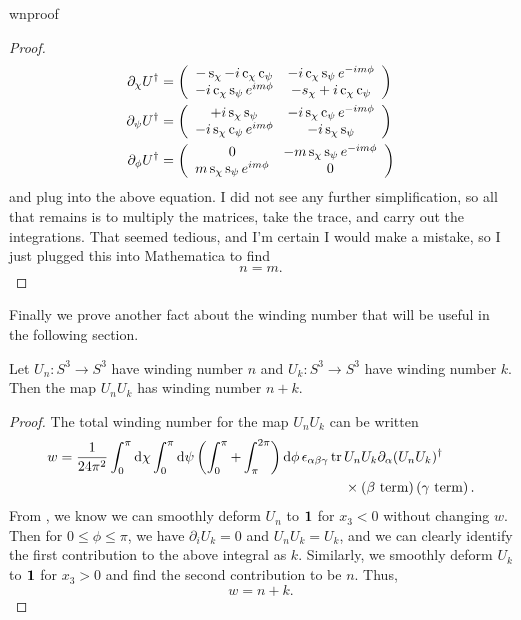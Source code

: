 \begin{proposition}{}{wnproof}
\begin{proof}
\begin{equation*}
\begin{aligned}
    \partial_\chi U^\dagger
             &=\left(\begin{array}{cc}
                  -\operatorname{s}_\chi-i\operatorname{c}_\chi\operatorname{c}_\psi  & -i\operatorname{c}_\chi\operatorname{s}_\psi e^{-im\phi}\\
                 -i\operatorname{c}_\chi\operatorname{s}_\psi e^{im\phi} & -s_\chi+i\operatorname{c}_\chi\operatorname{c}_\psi 
                \end{array}\right)\\
    \partial_\psi U^\dagger
             &=\left(\begin{array}{cc}
                  +i\operatorname{s}_\chi\operatorname{s}_\psi & -i\operatorname{s}_\chi\operatorname{c}_\psi e^{-im\phi}\\
                 -i\operatorname{s}_\chi\operatorname{c}_\psi e^{im\phi} & -i\operatorname{s}_\chi\operatorname{s}_\psi 
                \end{array}\right)\\
  \partial_\phi U^\dagger
             &=\left(\begin{array}{cc}
                  0 & -m\operatorname{s}_\chi\operatorname{s}_\psi e^{-im\phi}\\
                 m\operatorname{s}_\chi\operatorname{s}_\psi e^{im\phi} & 0 
                \end{array}\right)
  \end{aligned}
  \end{equation*}
  and plug into the above equation. I did not see any further simplification,
  so all that remains is to multiply the matrices, take the trace, and
  carry out the integrations. That seemed tedious, and I'm certain I would
  make a mistake, so I just plugged this into Mathematica to find 
  $$n=m.$$
\end{proof}\end{proposition}

Finally we prove another fact about the winding number that will be useful
in the following section.
\begin{proposition}{}{}
  Let $U_n:S^3\to S^3$ have winding number $n$ and
  $U_k:S^3\to S^3$ have winding number $k$. Then the map
  $U_n U_k$ has winding number $n+k$.
  \begin{proof}
    The total winding number for the map $U_n U_k$ can be written
    \begin{equation*}\begin{aligned}
      w=\frac{1}{24\pi^2}\int_0^\pi\dd{\chi}\int_0^\pi\dd{\psi}
          \left(\int_0^\pi+\int_\pi^{2\pi}\right)\dd{\phi}
          \epsilon_{\alpha\beta\gamma}\tr\,
          &U_nU_k\partial_\alpha(U_nU_k)^\dagger\\
          &\times\left(\text{$\beta$ term}\right)
          \left(\text{$\gamma$ term}\right).
    \end{aligned}\end{equation*}
    From , we know we can smoothly
    deform $U_n$ to ${\mathbf 1}$ for $x_3<0$ without changing $w$.
    Then for $0\leq\phi\leq\pi$, we have
    $\partial_i U_k=0$ and $U_n U_k=U_k$, and we can clearly identify
    the first contribution to the above integral as $k$.
    Similarly, we smoothly deform $U_k$ to ${\mathbf 1}$ for
    $x_3>0$ and find the second contribution to be $n$. Thus,
    $$w=n+k.$$
  \end{proof}
\end{proposition}


